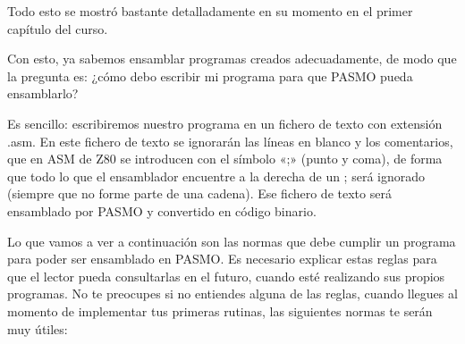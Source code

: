 \documentclass[letterpaper,10pt,spanish]{sphinxmanual}
\begin{document}
Todo esto se mostró bastante detalladamente en su momento en el primer capítulo del curso.

Con esto, ya sabemos ensamblar programas creados adecuadamente, de modo que la pregunta es: ¿cómo debo escribir mi programa para que PASMO pueda ensamblarlo?

Es sencillo: escribiremos nuestro programa en un fichero de texto con extensión .asm. En este fichero de texto se ignorarán las líneas en blanco y los comentarios, que en ASM de Z80 se introducen con el símbolo «;» (punto y coma), de forma que todo lo que el ensamblador encuentre a la derecha de un ; será ignorado (siempre que no forme parte de una cadena). Ese fichero de texto será ensamblado por PASMO y convertido en código binario.

Lo que vamos a ver a continuación son las normas que debe cumplir un programa para poder ser ensamblado en PASMO. Es necesario explicar estas reglas para que el lector pueda consultarlas en el futuro, cuando esté realizando sus propios programas. No te preocupes si no entiendes alguna de las reglas, cuando llegues al momento de implementar tus primeras rutinas, las siguientes normas te serán muy útiles:
\end{document}
